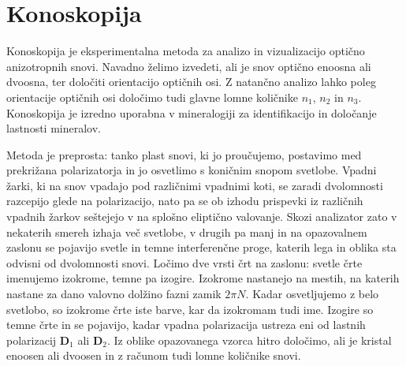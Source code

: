 \section{Konoskopija}
Konoskopija je eksperimentalna metoda za analizo in vizualizacijo optično anizotropnih snovi. 
Navadno želimo izvedeti, ali je snov optično enoosna ali dvoosna, ter določiti orientacijo 
optičnih osi. Z natančno analizo lahko poleg orientacije optičnih osi določimo 
tudi glavne lomne količnike $n_1$, $n_2$ in $n_3$. Konoskopija je izredno uporabna v mineralogiji
za identifikacijo in določanje lastnosti mineralov.

Metoda je preprosta: tanko plast snovi, ki jo proučujemo, postavimo med prekrižana 
polarizatorja in jo osvetlimo s koničnim snopom svetlobe. Vpadni žarki, ki na snov vpadajo
pod različnimi vpadnimi koti, se zaradi dvolomnosti razcepijo glede na polarizacijo, nato 
pa se ob izhodu prispevki iz različnih vpadnih žarkov seštejejo v na splošno eliptično valovanje.
Skozi analizator zato v nekaterih smereh izhaja več svetlobe, v drugih pa manj in na 
opazovalnem zaslonu se pojavijo svetle in temne interferenčne proge, katerih lega in oblika sta
odvisni od dvolomnosti snovi. Ločimo dve vrsti črt na zaslonu: svetle črte imenujemo izokrome, temne
pa izogire. Izokrome nastanejo na mestih, na katerih nastane za dano valovno dolžino 
fazni zamik $2\pi N$. Kadar osvetljujemo z belo svetlobo, so izokrome črte iste barve, kar da
izokromam tudi ime. Izogire so temne črte in se pojavijo, kadar vpadna
polarizacija ustreza eni od lastnih polarizacij $\mathbf{D}_1$ ali $\mathbf{D}_2$. Iz oblike
opazovanega vzorca hitro določimo, ali je kristal enoosen ali dvoosen in z računom tudi lomne
količnike snovi.
